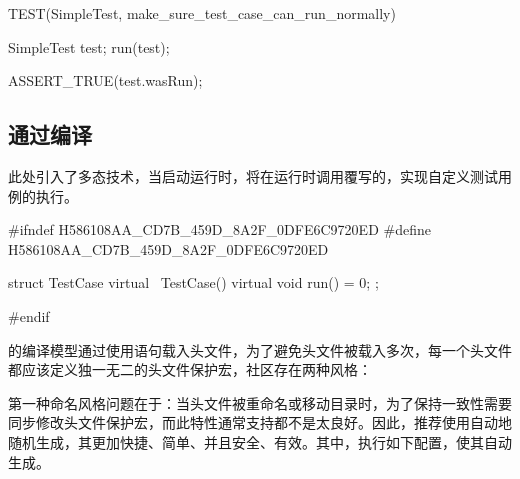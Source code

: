 \begin{content}
\begin{leftbar}
\begin{c++}[caption={\ttfamily{test/mars/core/TestCaseSpec.cc}}]
TEST(SimpleTest, make_sure_test_case_can_run_normally) {
  SimpleTest test;
  run(test);

  ASSERT_TRUE(test.wasRun);
}
 \end{c++}
\end{leftbar}

\subsection{通过编译}

此处引入了多态技术，当启动运行时，将在运行时调用覆写的，实现自定义测试用例的执行。

\begin{leftbar}
 \begin{c++}[caption={\ttfamily{include/mars/core/TestCase.h}}]
#ifndef H586108AA_CD7B_459D_8A2F_0DFE6C9720ED
#define H586108AA_CD7B_459D_8A2F_0DFE6C9720ED

struct TestCase {
  virtual ~TestCase() {}
  virtual void run() = 0;
};

#endif
  \end{c++}
\end{leftbar}

\begin{story}
  \begin{center}
  \end{center}

\begin{content}

的编译模型通过使用语句载入头文件，为了避免头文件被载入多次，每一个头文件都应该定义独一无二的头文件保护宏，社区存在两种风格：

\begin{enum}
\end{enum}

第一种命名风格问题在于：当头文件被重命名或移动目录时，为了保持一致性需要同步修改头文件保护宏，而此特性通常支持都不是太良好。因此，推荐使用自动地随机生成，其更加快捷、简单、并且安全、有效。其中，执行如下配置，使其自动生成。

\begin{leftbar}
\end{leftbar}


\end{content}
\end{story}
\end{content}
